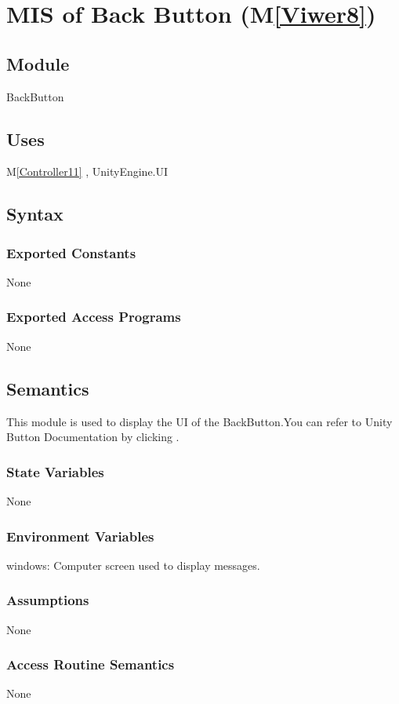 \documentclass[12pt, titlepage]{article}
\newcommand{\mref}[1]{M\ref{#1}}
\begin{document}
\newpage

\section{MIS of Back Button (\mref{Viwer8})}

\subsection{Module}
BackButton

\subsection{Uses}
\mref{Controller11}  , UnityEngine.UI

\subsection{Syntax}
\subsubsection{Exported Constants}
None
\subsubsection{Exported Access Programs}
None

\subsection{Semantics}
This module is used to display the UI of the BackButton.You can refer to Unity Button Documentation by clicking \bref.
\subsubsection{State Variables}
None
\subsubsection{Environment Variables}
windows: Computer screen used to display messages.
\subsubsection{Assumptions}
None
\subsubsection{Access Routine Semantics}
None
\end{document}
